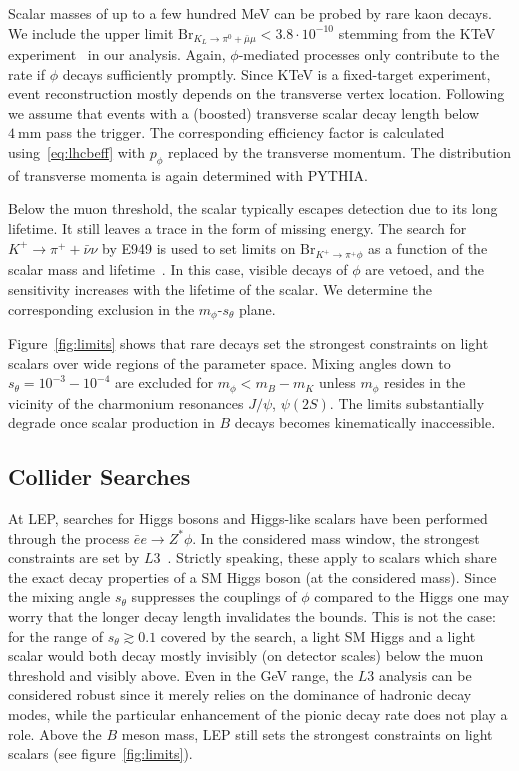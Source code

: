 \documentclass[preprintnumbers,twocolumn,aps,floats,nofootinbib]{revtex4-1}
\begin{document}
Scalar masses of up to a few hundred MeV can be probed by rare kaon decays. We include the upper limit $\text{Br}_{K_L\rightarrow \pi^0+\bar{\mu}\mu}<3.8\cdot 10^{-10}$ stemming from the KTeV experiment~\cite{AlaviHarati:2000hs} in our analysis. Again, $\phi$-mediated processes only contribute to the rate if $\phi$ decays sufficiently promptly. Since KTeV is a fixed-target experiment, event reconstruction mostly depends on the transverse vertex location. Following~\cite{Dolan:2014ska} we assume that events with a (boosted) transverse scalar decay length below $4\:\text{mm}$ pass the trigger. The corresponding efficiency factor is calculated using~\eqref{eq:lhcbeff} with $p_\phi$ replaced by the transverse momentum. The distribution of transverse momenta is again determined with PYTHIA. 

Below the muon threshold, the scalar typically escapes detection due to its long lifetime. It still leaves a trace in the form of missing energy. The search for $K^+\rightarrow \pi^+ + \bar{\nu}\nu $ by E949 is used to set limits on $\text{Br}_{K^+\rightarrow \pi^+  \phi}$ as a function of the scalar mass and lifetime~\cite{Artamonov:2009sz}. In this case, visible decays of $\phi$ are vetoed, and the sensitivity increases with the lifetime of the scalar. We determine the corresponding exclusion in the $m_\phi$-$s_\theta$ plane.

Figure~\ref{fig:limits} shows that rare decays set the strongest constraints on light scalars over wide regions of the parameter space. Mixing angles down to $s_\theta=10^{-3}-10^{-4}$ are excluded for $m_\phi < m_B-m_K$ unless $m_\phi$ resides in the vicinity of the charmonium resonances $J/\psi$, $\psi(2S)$. The limits substantially degrade once scalar production in $B$ decays becomes kinematically inaccessible.


\subsection{Collider Searches}
At LEP, searches for Higgs bosons and Higgs-like scalars have been performed through the process $\bar{e}e\rightarrow Z^*\phi$. In the considered mass window, the strongest constraints are set by $L3$~\cite{Acciarri:1996um}. Strictly speaking, these apply to scalars which share the exact decay properties of a SM Higgs boson (at the considered mass). Since the mixing angle $s_\theta$ suppresses the couplings of $\phi$ compared to the Higgs one may worry that the longer decay length invalidates the bounds. This is not the case: for the range of $s_\theta\gtrsim 0.1$ covered by the search, a light SM Higgs and a light scalar would both decay mostly invisibly (on detector scales) below the muon threshold and visibly above. Even in the GeV range, the $L3$ analysis can be considered robust since it merely relies on the dominance of hadronic decay modes, while the particular enhancement of the pionic decay rate does not play a role. Above the $B$ meson mass, LEP still sets the strongest constraints on light scalars (see figure~\ref{fig:limits}). 
\end{document}
